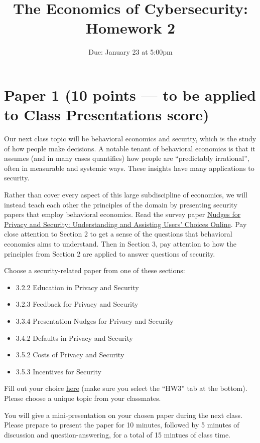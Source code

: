 \documentclass[11pt]{article}
\title{The Economics of Cybersecurity: Homework 2}
\date{Due: January 23 at 5:00pm}
\author{}
\begin{document}
\maketitle


\section*{Paper 1 (10 points --- to be applied to Class Presentations score)}

Our next class topic will be behavioral economics and security, which is the study of how people make decisions. A notable tenant of behavioral economics is that it assumes (and in many cases quantifies) how people are ``predictably irrational'', often in measurable and systemic ways. These insights have many applications to security.

Rather than cover every aspect of this large subdiscipline of economics, we will instead teach each other the principles of the domain by presenting security papers that employ behavioral economics. Read the survey paper \href{https://dl.acm.org/doi/abs/10.1145/3054926}{Nudges for Privacy and Security: Understanding and Assisting Users' Choices Online}. Pay close attention to Section 2 to get a sense of the questions that behavioral economics aims to understand. Then in Section 3, pay attention to how the principles from Section 2 are applied to answer questions of security. 

Choose a security-related paper from one of these sections:
\begin{itemize}
    \item 3.2.2 Education in Privacy and Security
    \item 3.2.3 Feedback for Privacy and Security
    \item 3.3.4 Presentation Nudges for Privacy and Security
    \item 3.4.2 Defaults in Privacy and Security
    \item 3.5.2 Costs of Privacy and Security
    \item 3.5.3 Incentives for Security
\end{itemize}
Fill out your choice \href{https://docs.google.com/spreadsheets/d/1SdaMpeCo4CE8o0U_irGhWmVXJYHybRWoiX4uwZYMhCE/edit?usp=sharing}{here} (make sure you select the ``HW3'' tab at the bottom). Please choose a unique topic from your classmates.

You will give a mini-presentation on your chosen paper during the next class. Please prepare to present the paper for 10 minutes, followed by 5 minutes of discussion and question-answering, for a total of 15 mintues of class time.
\end{document}
